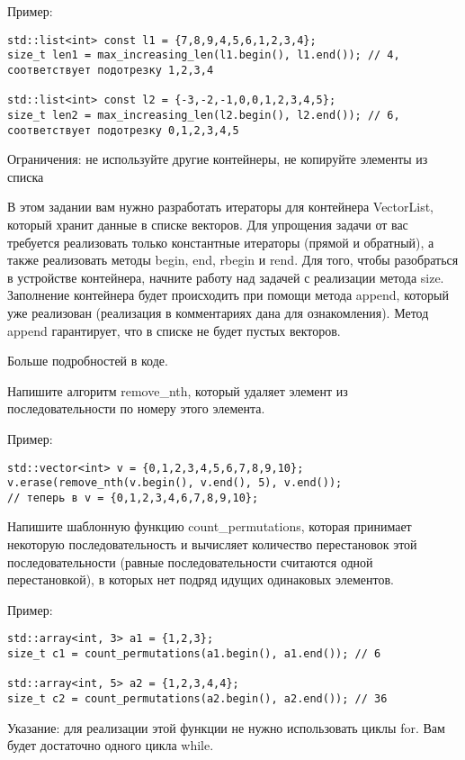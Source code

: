 \documentclass[]{article}
\begin{document}
Пример:
\begin{verbatim}
std::list<int> const l1 = {7,8,9,4,5,6,1,2,3,4};
size_t len1 = max_increasing_len(l1.begin(), l1.end()); // 4, соответствует подотрезку 1,2,3,4

std::list<int> const l2 = {-3,-2,-1,0,0,1,2,3,4,5};
size_t len2 = max_increasing_len(l2.begin(), l2.end()); // 6, соответствует подотрезку 0,1,2,3,4,5

\end{verbatim}
Ограничения: не используйте другие контейнеры, не копируйте элементы из списка



В этом задании вам нужно разработать итераторы для контейнера VectorList, который хранит данные в списке векторов. Для упрощения задачи от вас требуется реализовать только константные итераторы (прямой и обратный), а также реализовать методы begin, end, rbegin и rend. Для того, чтобы разобраться в устройстве контейнера, начните работу над задачей с реализации метода size. Заполнение контейнера будет происходить при помощи метода append, который уже реализован (реализация в комментариях дана для ознакомления). Метод append гарантирует, что в списке не будет пустых векторов.

Больше подробностей в коде.



Напишите алгоритм remove\_nth, который удаляет элемент из последовательности по номеру этого элемента.

Пример:
\begin{verbatim}
std::vector<int> v = {0,1,2,3,4,5,6,7,8,9,10};
v.erase(remove_nth(v.begin(), v.end(), 5), v.end());
// теперь в v = {0,1,2,3,4,6,7,8,9,10};

\end{verbatim}

Напишите шаблонную функцию count\_permutations, которая принимает некоторую последовательность и вычисляет количество перестановок этой последовательности (равные последовательности считаются одной перестановкой), в которых нет подряд идущих одинаковых элементов.

Пример:
\begin{verbatim}
std::array<int, 3> a1 = {1,2,3};
size_t c1 = count_permutations(a1.begin(), a1.end()); // 6

std::array<int, 5> a2 = {1,2,3,4,4};
size_t c2 = count_permutations(a2.begin(), a2.end()); // 36
\end{verbatim}

Указание: для реализации этой функции не нужно использовать циклы for. Вам будет достаточно одного цикла while.
\end{document}
